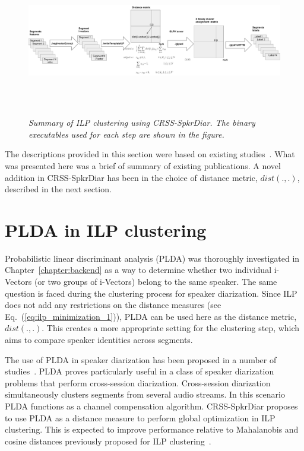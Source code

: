 \begin{figure}[ht!]
	\centering
	\includegraphics[height = 2.6in, width=1\textwidth]{figures/ilp_clustering_summary}
	\caption{\it \small Summary of ILP clustering using CRSS-SpkrDiar. The binary executables used for each step are shown in the figure. }
	\label{fig:ilp_clustering}
	\vspace{-3mm}
\end{figure}


The descriptions provided in this section were based on existing studies~\cite{mueller2010ILP, rouvier2012ilp,dupuy2012ivectorsILP,dupuy2014ILPimprovement}. 
What was presented here was a brief of summary of existing publications. 
A novel addition in CRSS-SpkrDiar has been in the choice of distance metric, $dist(.,.)$, described in the next section. 

\section{PLDA in ILP clustering}
\label{sec:plda_ilp}
Probabilistic linear discriminant analysis (PLDA) was thoroughly investigated in Chapter~\ref{chapter:backend} as a way to determine whether two individual i-Vectors (or two groups of i-Vectors) belong to the same speaker. 
The same question is faced during the clustering process for speaker diarization. 
Since ILP does not add any restrictions on the distance measures (see Eq.~(\ref{eq:ilp_minimization_1})), PLDA can be used here as the distance metric, $dist(.,.)$. 
This creates a more appropriate setting for the clustering step, which aims to compare speaker identities across segments. 

The use of PLDA in speaker diarization has been proposed in a number of studies~\cite{prazak2011PLDAdrz, silovsky2011PLDAdrz, sell2014PLDAdrz}. 
PLDA proves particularly useful in a class of speaker diarization problems that perform cross-session diarization. 
Cross-session diarization simultaneously clusters segments from several audio streams. 
In this scenario PLDA functions as a channel compensation algorithm. 
CRSS-SpkrDiar proposes to use PLDA as a distance measure to perform global optimization in ILP clustering. 
This is expected to improve performance relative to Mahalanobis and cosine distances previously proposed for ILP clustering~\cite{dupuy2012ivectorsILP,dupuy2014ILPimprovement}. 

